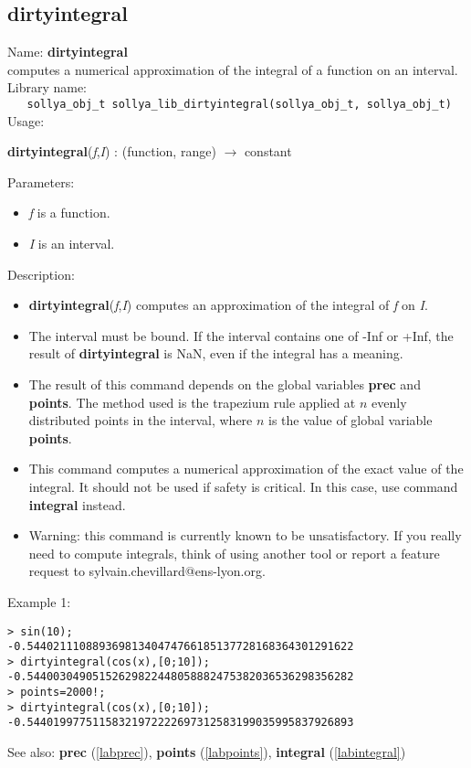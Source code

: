 \subsection{dirtyintegral}
\label{labdirtyintegral}
\noindent Name: \textbf{dirtyintegral}\\
\phantom{aaa}computes a numerical approximation of the integral of a function on an interval.\\[0.2cm]
\noindent Library name:\\
\verb|   sollya_obj_t sollya_lib_dirtyintegral(sollya_obj_t, sollya_obj_t)|\\[0.2cm]
\noindent Usage: 
\begin{center}
\textbf{dirtyintegral}(\emph{f},\emph{I}) : (\textsf{function}, \textsf{range}) $\rightarrow$ \textsf{constant}\\
\end{center}
Parameters: 
\begin{itemize}
\item \emph{f} is a function.
\item \emph{I} is an interval.
\end{itemize}
\noindent Description: \begin{itemize}

\item \textbf{dirtyintegral}(\emph{f},\emph{I}) computes an approximation of the integral of \emph{f} on \emph{I}.

\item The interval must be bound. If the interval contains one of -Inf or +Inf, the 
   result of \textbf{dirtyintegral} is NaN, even if the integral has a meaning.

\item The result of this command depends on the global variables \textbf{prec} and \textbf{points}.
   The method used is the trapezium rule applied at $n$ evenly distributed
   points in the interval, where $n$ is the value of global variable \textbf{points}.

\item This command computes a numerical approximation of the exact value of the 
   integral. It should not be used if safety is critical. In this case, use
   command \textbf{integral} instead.

\item Warning: this command is currently known to be unsatisfactory. If you really
   need to compute integrals, think of using another tool or report a feature
   request to sylvain.chevillard@ens-lyon.org.
\end{itemize}
\noindent Example 1: 
\begin{center}\begin{minipage}{15cm}\begin{Verbatim}[frame=single]
> sin(10);
-0.54402111088936981340474766185137728168364301291622
> dirtyintegral(cos(x),[0;10]);
-0.54400304905152629822448058882475382036536298356282
> points=2000!;
> dirtyintegral(cos(x),[0;10]);
-0.54401997751158321972222697312583199035995837926893
\end{Verbatim}
\end{minipage}\end{center}
See also: \textbf{prec} (\ref{labprec}), \textbf{points} (\ref{labpoints}), \textbf{integral} (\ref{labintegral})
